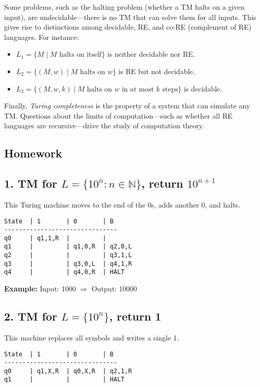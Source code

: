 \documentclass{article}
\begin{document}
Some problems, such as the halting problem (whether a TM halts on a given input), are undecidable—there is no TM that can solve them for all inputs. This gives rise to distinctions among decidable, RE, and co-RE (complement of RE) languages. For instance:
\begin{itemize}
    \item \( L_1 = \{M \mid M \text{ halts on itself} \} \) is neither decidable nor RE.
    \item \( L_2 = \{(M, w) \mid M \text{ halts on } w\} \) is RE but not decidable.
    \item \( L_3 = \{(M, w, k) \mid M \text{ halts on } w \text{ in at most } k \text{ steps} \} \) is decidable.
\end{itemize}

Finally, \textit{Turing completeness} is the property of a system that can simulate any TM. Questions about the limits of computation—such as whether all RE languages are recursive—drive the study of computation theory.

\subsection{Homework}
\subsection*{1. TM for \( L = \{10^n : n \in \mathbb{N} \} \), return \(10^{n+1}\)}
This Turing machine moves to the end of the 0s, adds another 0, and halts.

\begin{verbatim}
State  | 1       | 0       | B
-------------------------------
q0     | q1,1,R  |         | 
q1     |         | q1,0,R  | q2,0,L
q2     |         |         | q3,1,L
q3     |         | q3,0,L  | q4,1,R
q4     |         | q4,0,R  | HALT
\end{verbatim}

\textbf{Example:} Input: 1000 $\Rightarrow$ Output: 10000

\subsection*{2. TM for \( L = \{10^n\} \), return 1}
This machine replaces all symbols and writes a single 1.

\begin{verbatim}
State  | 1       | 0       | B
-------------------------------
q0     | q1,X,R  | q0,X,R  | q2,1,R
q1     |         |         | HALT
\end{verbatim}
\end{document}
